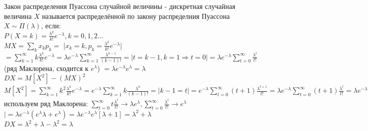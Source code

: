Закон распределения Пуассона случайной величины - дискретная случайная величина $X$ называется распределённой по закону распределния Пуассона $X \sim \Pi(\lambda)$, если:\\
$P(X = k) = \frac{\lambda^{k}}{k!}e^{-\lambda}, k = 0, 1, 2...$\\
$MX = \sum\limits_{k} x_{k} p_{k} = $ |$x_{k} = k, p_{k} = \frac{\lambda^{k}}{k!}e^{-\lambda}$| $ = \sum\limits_{k = 1}^{\infty} k \frac{\lambda^{k}}{k!}e^{-\lambda} = \lambda e^{-\lambda} \sum\limits_{k = 1}^{\infty} \frac{\lambda^{k - 1}}{(k - 1)!} = |t = k - 1, k = 1 \Rightarrow t = 0| = \lambda e^{-\lambda} \sum\limits_{t = 0}^{\infty} \frac{\lambda^{t}}{t!} $ (ряд Маклорена, сходится к $e^{\lambda}$) $ = \lambda e^{-\lambda} e^{\lambda} = \lambda$\\
$DX = M[X^{2}] - (MX)^{2}$\\
$M[X^{2}] = \sum\limits_{k = 1}^{\infty} k^{2} \frac{\lambda^{k}}{k!} e^{-\lambda} = e^{-\lambda} \sum\limits_{k = 1}^{\infty} k \frac{\lambda^{k}}{(k - 1)!} = |k - 1= t| = e^{-\lambda} \sum\limits_{t = 0}^{\infty} (t + 1) \frac{\lambda^{t + 1}}{t!} = \lambda e^{-\lambda} \sum\limits_{t= 0}^{\infty} (t + 1) \frac{\lambda^{t}}{t!} = \lambda e^{-\lambda} [\sum\limits_{t = 0}^{\infty} t \frac{\lambda^{t}}{t!} + \sum\limits_{t = 0}^{\infty} \frac{\lambda^{t}}{t!}] = \bigg|$ используем ряд Маклорена: $\sum\limits_{t = 0}^{\infty} t \frac{\lambda^{t}}{t!} \rightarrow \lambda e^{\lambda}, \sum\limits_{t = 0}^{\infty} \frac{\lambda^{t}}{t!} \rightarrow e^{\lambda}$ $\bigg| = \lambda e^{-\lambda} (e^{\lambda} \lambda + e^{\lambda}) = \lambda e^{-\lambda} e^{\lambda} [\lambda + 1] = \lambda^{2} + \lambda$\\
$DX = \lambda^{2} + \lambda - \lambda^{2} = \lambda$\\


